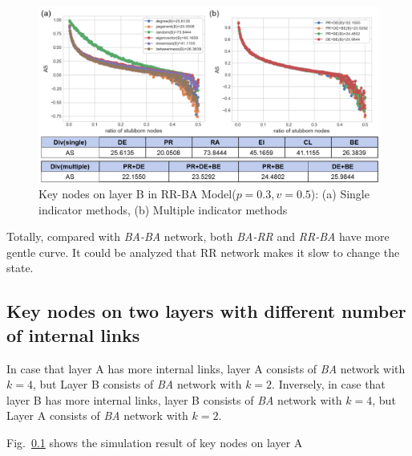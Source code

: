 \begin{figure}[!htb]
	\centering
	\includegraphics[width=\hsize]{figure/chap5_keynode_RR_BA_B.png}
	\caption{Key nodes on layer B in RR-BA Model($p=0.3, v=0.5$):
		(a) Single indicator methods, (b) Multiple indicator methods}
	\label{chap5_keynode_RR_BA_B}
\end{figure}



Totally, compared with \textit{BA-BA} network, both \textit{BA-RR} and \textit{RR-BA} have more gentle curve. It could be analyzed that RR network makes it slow to change the state.  





\subsection{Key nodes on two layers with different number of internal links}
In case that layer A has more internal links, layer A consists of \textit{BA} network with $k=4$, but Layer B consists of \textit{BA} network with $k=2$. Inversely, in case that layer B has more internal links, layer B consists of \textit{BA} network with $k=4$, but Layer A consists of \textit{BA} network with $k=2$. 

Fig.~\ref{} shows the simulation result of key nodes on layer A



